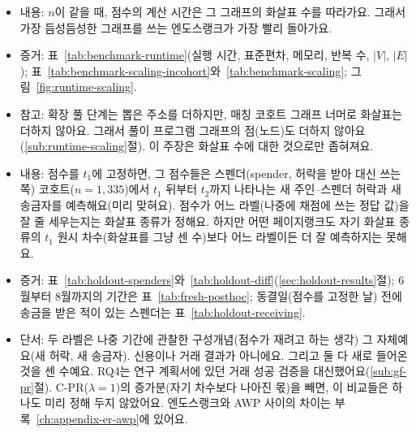 
\begin{itemize}
\item 내용: $n$이 같을 때, 점수의 계산 시간은 그 그래프의 화살표 수를 따라가요. 그래서 가장 듬성듬성한 그래프를 쓰는 엔도스랭크가 가장 빨리 돌아가요.
\item 증거: 표~\ref{tab:benchmark-runtime}(실행 시간, 표준편차, 메모리, 반복 수, $|V|$, $|E|$); 표~\ref{tab:benchmark-scaling-incohort}와~\ref{tab:benchmark-scaling}; 그림~\ref{fig:runtime-scaling}.
\item 참고: 확장 풀 단계는 뽑은 주소를 더하지만, 매칭 코호트 그래프 너머로 화살표는 더하지 않아요. 그래서 풀이 프로그램 그래프의 점(노드)도 더하지 않아요(\ref{sub:runtime-scaling}절). 이 주장은 화살표 수에 대한 것으로만 좁혀져요.
\end{itemize}


\begin{itemize}
\item 내용: 점수를 $t_1$에 고정하면, 그 점수들은 스펜더(spender, 허락을 받아 대신 쓰는 쪽) 코호트($n=1{,}335$)에서 $t_1$ 뒤부터 $t_2$까지 나타나는 새 주인--스펜더 허락과 새 송금자를 예측해요(미리 맞혀요). 점수가 어느 라벨(나중에 채점에 쓰는 정답 값)을 잘 줄 세우는지는 화살표 종류가 정해요. 하지만 어떤 페이지랭크도 자기 화살표 종류의 $t_1$ 원시 차수(화살표를 그냥 센 수)보다 어느 라벨이든 더 잘 예측하지는 못해요.
\item 증거: 표~\ref{tab:holdout-spenders}와~\ref{tab:holdout-diff}(\ref{sec:holdout-results}절); 6월부터 8월까지의 기간은 표~\ref{tab:fresh-posthoc}; 동결일(점수를 고정한 날) 전에 송금을 받은 적이 있는 스펜더는 표~\ref{tab:holdout-receiving}.
\item 단서: 두 라벨은 나중 기간에 관찰한 구성개념(점수가 재려고 하는 생각) 그 자체예요(새 허락, 새 송금자). 신용이나 거래 결과가 아니에요. 그리고 둘 다 새로 들어온 것을 센 수예요. RQ4는 연구 계획서에 있던 거래 성공 검증을 대신했어요(\ref{sub:gf-pr}절). C-PR($\lambda=1$)의 증가분(자기 차수보다 나아진 몫)을 빼면, 이 비교들은 하나도 미리 정해 두지 않았어요. 엔도스랭크와 AWP 사이의 차이는 부록~\ref{ch:appendix-er-awp}에 있어요.
\end{itemize}


